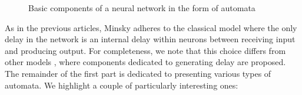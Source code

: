 \documentclass[10pt]{article}
\begin{document}
\begin{figure}[!t]
	\centering
	\hspace{5mm}
	\caption{Basic components of a neural network in the form of automata}
	\label{fig: elementiFondamentali}
\end{figure}


As in the previous articles, Minsky adheres to the classical model where the only delay in the network is an internal delay within neurons between receiving input and producing output. For completeness, we note that this choice differs from other models \cite{Burks1957}\cite{Copi1958}, where components dedicated to generating delay are proposed.\\
The remainder of the first part is dedicated to presenting various types of automata. We highlight a couple of particularly interesting ones:
\end{document}
